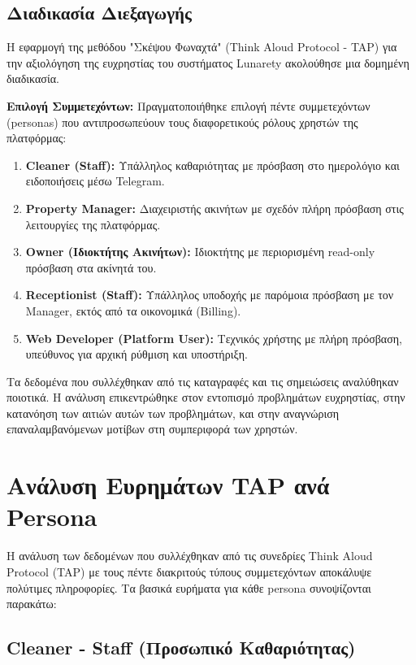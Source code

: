 \documentclass[
	12pt, %
	oneside, %
	greek,
	onehalfspacing, %
	liststotoc, %
	toctotoc, %
	parskip, %
	headsepline, %
]{MastersDoctoralThesis} %
\begin{document}
\subsection{Διαδικασία Διεξαγωγής}

Η εφαρμογή της μεθόδου "Σκέψου Φωναχτά" (Think Aloud Protocol - TAP) για την αξιολόγηση της ευχρηστίας του συστήματος Lunarety ακολούθησε μια δομημένη διαδικασία.

\textbf{Επιλογή Συμμετεχόντων:} Πραγματοποιήθηκε επιλογή πέντε συμμετεχόντων (personas) που αντιπροσωπεύουν τους διαφορετικούς ρόλους χρηστών της πλατφόρμας:

\begin{enumerate}
    \item \textbf{Cleaner (Staff):} Υπάλληλος καθαριότητας με πρόσβαση στο ημερολόγιο και ειδοποιήσεις μέσω Telegram.
    \item \textbf{Property Manager:} Διαχειριστής ακινήτων με σχεδόν πλήρη πρόσβαση στις λειτουργίες της πλατφόρμας.
    \item \textbf{Owner (Ιδιοκτήτης Ακινήτων):} Ιδιοκτήτης με περιορισμένη read-only πρόσβαση στα ακίνητά του.
    \item \textbf{Receptionist (Staff):} Υπάλληλος υποδοχής με παρόμοια πρόσβαση με τον Manager, εκτός από τα οικονομικά (Billing).
    \item \textbf{Web Developer (Platform User):} Τεχνικός χρήστης με πλήρη πρόσβαση, υπεύθυνος για αρχική ρύθμιση και υποστήριξη.
\end{enumerate}

Τα δεδομένα που συλλέχθηκαν από τις καταγραφές και τις σημειώσεις αναλύθηκαν ποιοτικά. Η ανάλυση επικεντρώθηκε στον εντοπισμό προβλημάτων ευχρηστίας, στην κατανόηση των αιτιών αυτών των προβλημάτων, και στην αναγνώριση επαναλαμβανόμενων μοτίβων στη συμπεριφορά των χρηστών.

\section{Ανάλυση Ευρημάτων TAP ανά Persona}
\label{sec:tap-findings}

Η ανάλυση των δεδομένων που συλλέχθηκαν από τις συνεδρίες Think Aloud Protocol (TAP) με τους πέντε διακριτούς τύπους συμμετεχόντων αποκάλυψε πολύτιμες πληροφορίες. Τα βασικά ευρήματα για κάθε persona συνοψίζονται παρακάτω:

\subsection{Cleaner - Staff (Προσωπικό Καθαριότητας)}
\end{document}
